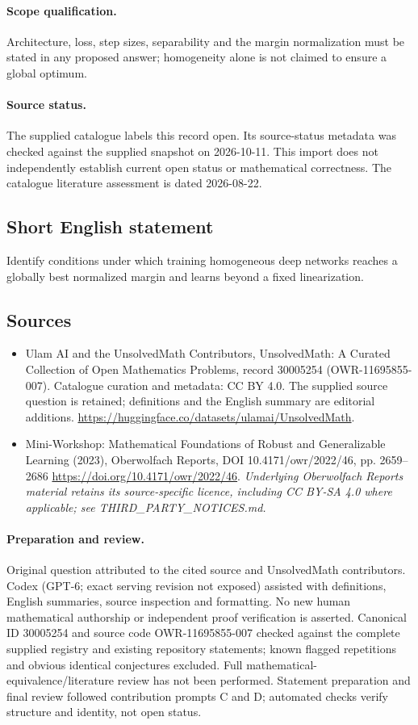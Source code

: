 \documentclass[11pt]{article}
\begin{document}
\paragraph{Scope qualification.}
Architecture, loss, step sizes, separability and the margin normalization must be stated in any proposed answer; homogeneity alone is not claimed to ensure a global optimum.
\paragraph{Source status.}
The supplied catalogue labels this record open. Its source-status metadata was checked against the supplied snapshot on 2026-10-11. This import does not independently establish current open status or mathematical correctness. The catalogue literature assessment is dated 2026-08-22.
\subsection{Short English statement}
Identify conditions under which training homogeneous deep networks reaches a globally best normalized margin and learns beyond a fixed linearization.
\subsection{Sources}
\begin{itemize}
\item[S1] Ulam AI and the UnsolvedMath Contributors, UnsolvedMath: A Curated Collection of Open Mathematics Problems, record 30005254 (OWR-11695855-007). Catalogue curation and metadata: CC BY 4.0. The supplied source question is retained; definitions and the English summary are editorial additions.
\url{https://huggingface.co/datasets/ulamai/UnsolvedMath}.
\item[S2] Mini-Workshop: Mathematical Foundations of Robust and Generalizable Learning (2023), Oberwolfach Reports, DOI 10.4171/owr/2022/46, pp. 2659--2686
\url{https://doi.org/10.4171/owr/2022/46}.
\textit{Underlying Oberwolfach Reports material retains its source-specific licence, including CC BY-SA 4.0 where applicable; see THIRD\_PARTY\_NOTICES.md.}
\end{itemize}
\paragraph{Preparation and review.}
Original question attributed to the cited source and UnsolvedMath contributors. Codex (GPT-6; exact serving revision not exposed) assisted with definitions, English summaries, source inspection and formatting. No new human mathematical authorship or independent proof verification is asserted. Canonical ID 30005254 and source code OWR-11695855-007 checked against the complete supplied registry and existing repository statements; known flagged repetitions and obvious identical conjectures excluded. Full mathematical-equivalence/literature review has not been performed. Statement preparation and final review followed contribution prompts C and D; automated checks verify structure and identity, not open status.
\label{end:30005254}
\end{document}

